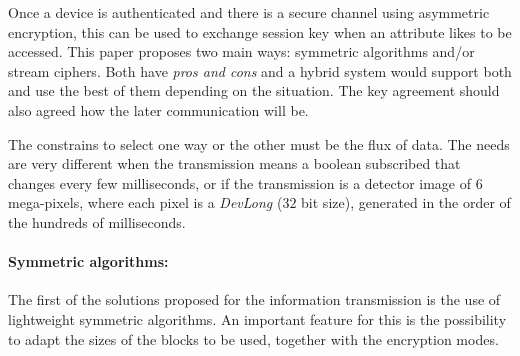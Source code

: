 \documentclass[10pt,a4paper,twoside]{llncs}
\begin{document}

Once a device is authenticated and there is a secure channel using asymmetric encryption, this can be used to exchange session key when an attribute likes to be accessed. This paper proposes two main ways: symmetric algorithms and/or stream ciphers. Both have \emph{pros and cons} and a hybrid system would support both and use the best of them depending on the situation. The key agreement should also agreed how the later communication will be.

The constrains to select one way or the other must be the flux of data. The needs are very different when the transmission means a boolean subscribed that changes every few milliseconds, or if the transmission is a detector image of 6 mega-pixels, where each pixel is a \emph{DevLong} ($32$ bit size), generated in the order of the hundreds of milliseconds.

\paragraph{Symmetric algorithms:} The first of the solutions proposed for the information transmission is the use of lightweight symmetric algorithms. An important feature for this is the possibility to adapt the sizes of the blocks to be used, together with the encryption modes.
\end{document}
